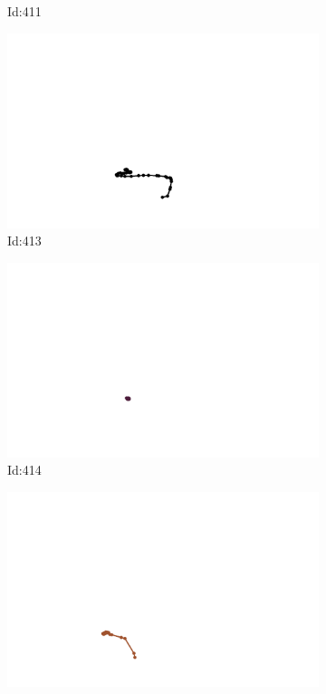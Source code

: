 \documentclass[12pt,twoside]{report}
\begin{document}
\begin{figure}
\begin{subfigure}[b]{0.20\textwidth}
\caption{Id:411}
\end{subfigure}
\begin{subfigure}[b]{0.20\textwidth}
\centering
\includegraphics[width=\textwidth]{../trajectories/413.png}
\caption{Id:413}
\end{subfigure}
\begin{subfigure}[b]{0.20\textwidth}
\centering
\includegraphics[width=\textwidth]{../trajectories/414.png}
\caption{Id:414}
\end{subfigure}
\begin{subfigure}[b]{0.20\textwidth}
\centering
\includegraphics[width=\textwidth]{../trajectories/415.png}

\end{subfigure}
\end{figure}
\end{document}
